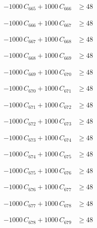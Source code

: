 \documentclass[a4paper,11pt]{article}
\begin{document}
\begin{align}
-1000\,C_{665} + 1000\,C_{666} &\geq 48 \nonumber
\end{align}

\begin{align}
-1000\,C_{666} + 1000\,C_{667} &\geq 48 \nonumber
\end{align}

\begin{align}
-1000\,C_{667} + 1000\,C_{668} &\geq 48 \nonumber
\end{align}

\begin{align}
-1000\,C_{668} + 1000\,C_{669} &\geq 48 \nonumber
\end{align}

\begin{align}
-1000\,C_{669} + 1000\,C_{670} &\geq 48 \nonumber
\end{align}

\begin{align}
-1000\,C_{670} + 1000\,C_{671} &\geq 48 \nonumber
\end{align}

\begin{align}
-1000\,C_{671} + 1000\,C_{672} &\geq 48 \nonumber
\end{align}

\begin{align}
-1000\,C_{672} + 1000\,C_{673} &\geq 48 \nonumber
\end{align}

\begin{align}
-1000\,C_{673} + 1000\,C_{674} &\geq 48 \nonumber
\end{align}

\begin{align}
-1000\,C_{674} + 1000\,C_{675} &\geq 48 \nonumber
\end{align}

\begin{align}
-1000\,C_{675} + 1000\,C_{676} &\geq 48 \nonumber
\end{align}

\begin{align}
-1000\,C_{676} + 1000\,C_{677} &\geq 48 \nonumber
\end{align}

\begin{align}
-1000\,C_{677} + 1000\,C_{678} &\geq 48 \nonumber
\end{align}

\begin{align}
-1000\,C_{678} + 1000\,C_{679} &\geq 48 \nonumber
\end{align}
\end{document}
